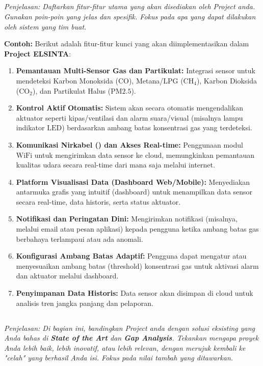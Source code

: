 \documentclass{elsinta}
\begin{document}
\subsection{\MainFeaturesTitle}
\textit{Penjelasan: Daftarkan fitur-fitur utama yang akan disediakan oleh Project anda. Gunakan poin-poin yang jelas dan spesifik. Fokus pada apa yang dapat dilakukan oleh sistem yang tim buat.}

\textbf{Contoh:} Berikut adalah fitur-fitur kunci yang akan diimplementasikan dalam \textbf{Project ELSINTA}:
\begin{enumerate}
    \item \textbf{Pemantauan Multi-Sensor Gas dan Partikulat:} Integrasi sensor untuk mendeteksi Karbon Monoksida ($\text{CO}$), Metana/LPG ($\text{CH}_4$), Karbon Dioksida ($\text{CO}_2$), dan Partikulat Halus ($\text{PM2.5}$).
    \item \textbf{Kontrol Aktif Otomatis:} Sistem akan secara otomatis mengendalikan aktuator seperti kipas/ventilasi dan alarm suara/visual (misalnya lampu indikator $\text{LED}$) berdasarkan ambang batas konsentrasi gas yang terdeteksi.
    \item \textbf{Komunikasi Nirkabel () dan Akses Real-time:} Penggunaan modul $\text{WiFi}$ untuk mengirimkan data sensor ke cloud, memungkinkan pemantauan kualitas udara secara real-time dari mana saja melalui internet.
    \item \textbf{Platform Visualisasi Data (Dashboard Web/Mobile):} Menyediakan antarmuka grafis yang intuitif (dashboard) untuk menampilkan data sensor secara real-time, data historis, serta status aktuator.
    \item \textbf{Notifikasi dan Peringatan Dini:} Mengirimkan notifikasi (misalnya, melalui email atau pesan aplikasi) kepada pengguna ketika ambang batas gas berbahaya terlampaui atau ada anomali.
    \item \textbf{Konfigurasi Ambang Batas Adaptif:} Pengguna dapat mengatur atau menyesuaikan ambang batas (threshold) konsentrasi gas untuk aktivasi alarm dan aktuator melalui dashboard.
    \item \textbf{Penyimpanan Data Historis:} Data sensor akan disimpan di cloud untuk analisis tren jangka panjang dan pelaporan.
\end{enumerate}

\subsection{\AdvantagesTitle}
\textit{Penjelasan: Di bagian ini, bandingkan Project anda dengan solusi eksisting yang Anda bahas di \textbf{State of the Art} dan \textbf{Gap Analysis}. Tekankan mengapa proyek Anda lebih baik, lebih inovatif, atau lebih relevan, dengan merujuk kembali ke "celah" yang berhasil Anda isi. Fokus pada nilai tambah yang ditawarkan.}
\end{document}
